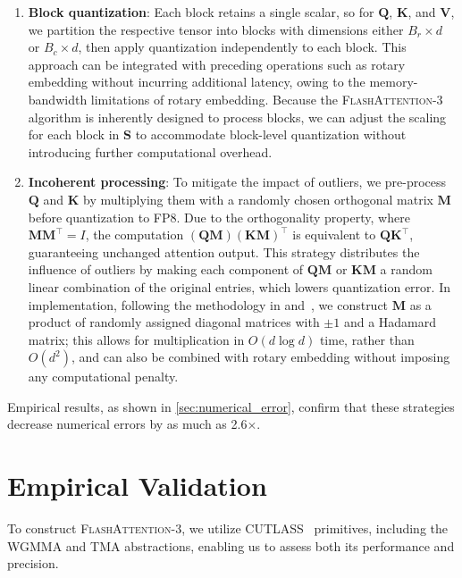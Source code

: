 \begin{enumerate}

\item \textbf{Block quantization}: Each block retains a single scalar, so for $\mathbf{Q}$, $\mathbf{K}$, and $\mathbf{V}$, we partition the respective tensor into blocks with dimensions either $B_r \times d$ or $B_c \times d$, then apply quantization independently to each block. This approach can be integrated with preceding operations such as rotary embedding without incurring additional latency, owing to the memory-bandwidth limitations of rotary embedding. Because the \textsc{FlashAttention-3} algorithm is inherently designed to process blocks, we can adjust the scaling for each block in $\mathbf{S}$ to accommodate block-level quantization without introducing further computational overhead.
\item \textbf{Incoherent processing}: To mitigate the impact of outliers, we pre-process $\mathbf{Q}$ and $\mathbf{K}$ by multiplying them with a randomly chosen orthogonal matrix $\mathbf{M}$ before quantization to FP8. Due to the orthogonality property, where $\mathbf{M} \mathbf{M}^\top = I$, the computation $(\mathbf{Q} \mathbf{M}) (\mathbf{K} \mathbf{M})^\top$ is equivalent to $\mathbf{Q} \mathbf{K}^\top$, guaranteeing unchanged attention output. This strategy distributes the influence of outliers by making each component of $\mathbf{Q} \mathbf{M}$ or $\mathbf{K} \mathbf{M}$ a random linear combination of the original entries, which lowers quantization error. In implementation, following the methodology in \citet{chee2024quip} and~\citet{tseng2024quip}, we construct $\mathbf{M}$ as a product of randomly assigned diagonal matrices with $\pm 1$ and a Hadamard matrix; this allows for multiplication in $O(d \log d)$ time, rather than $O(d^2)$, and can also be combined with rotary embedding without imposing any computational penalty.
\end{enumerate}

Empirical results, as shown in \cref{sec:numerical_error}, confirm that these strategies decrease numerical errors by as much as 2.6$\times$.

\section{Empirical Validation}
\label{sec:exp}

To construct \textsc{FlashAttention-3}, we utilize CUTLASS~\citep{Thakkar_CUTLASS_2023} primitives, including the WGMMA and TMA abstractions, enabling us to assess both its performance and precision.

